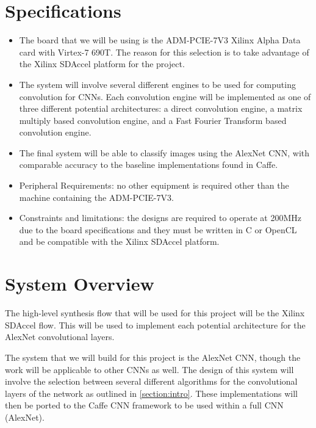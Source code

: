 \documentclass[conference,compsoc]{IEEEtran/IEEEtran}
\begin{document}
\section{Specifications}\label{section:spec}

\begin{itemize}
\item The board that we will be using is the ADM-PCIE-7V3 Xilinx Alpha Data card
with Virtex-7 690T. The reason for this selection is to take advantage of the
Xilinx SDAccel platform for the project.

\item The system will involve several different engines to be used for computing
convolution for CNNs. Each convolution engine
will be implemented as one of three different potential architectures: a direct
convolution engine, a matrix multiply based convolution engine, and a Fast Fourier
Transform based convolution engine.

\item The final system will be able to classify images using the AlexNet CNN, with
comparable accuracy to the baseline implementations found in Caffe.

\item Peripheral Requirements: no other equipment is required other than the machine
containing the ADM-PCIE-7V3.

\item Constraints and limitations: the designs are required to operate at 200MHz due
to the board specifications and they must be written in C or OpenCL and be compatible
with the Xilinx SDAccel platform.
\end{itemize}

\section{System Overview}\label{section:overview}

The high-level synthesis flow that will be used for this project will be the Xilinx
SDAccel flow. This will be used to implement each potential architecture for the
AlexNet convolutional layers.

The system that we will build for this project is the AlexNet CNN, though the work
will be applicable to other CNNs as well. The design of this system will involve the
selection between several different algorithms for the convolutional layers of the
network as outlined in \ref{section:intro}. These implementations will then be ported
to the Caffe CNN framework to be used within a full CNN (AlexNet).
\end{document}
